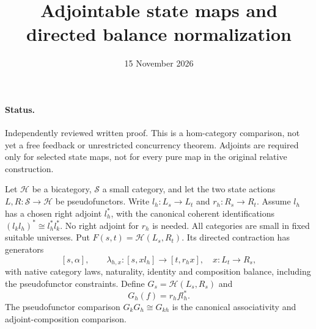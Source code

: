 \documentclass[11pt]{article}
\title{Adjointable state maps and directed balance normalization}
\date{15 November 2026}
\begin{document}
\maketitle
\paragraph{Status.} Independently reviewed written proof. This is a hom-category comparison, not yet a free feedback or unrestricted concurrency theorem. Adjoints are required only for selected state maps, not for every pure map in the original relative construction.

Let $\mathcal H$ be a bicategory, $\mathcal S$ a small category, and let the two state actions $L,R:\mathcal S\to\mathcal H$ be pseudofunctors. Write $l_h:L_s\to L_t$ and $r_h:R_s\to R_t$. Assume $l_h$ has a chosen right adjoint $l_h^*$, with the canonical coherent identifications $(l_kl_h)^*\cong l_h^*l_k^*$. No right adjoint for $r_h$ is needed. All categories are small in fixed suitable universes.
Put $F(s,t)=\mathcal H(L_s,R_t)$. Its directed contraction has generators
\[
 [s,\alpha],\qquad \lambda_{h,x}:[s,x l_h]\to[t,r_hx],\quad x:L_t\to R_s,
\]
with native category laws, naturality, identity and composition balance, including the pseudofunctor constraints.
Define $G_s=\mathcal H(L_s,R_s)$ and
\[
 G_h(f)=r_h f l_h^*.
\]
The pseudofunctor comparison $G_kG_h\cong G_{kh}$ is the canonical associativity and adjoint-composition comparison.
\end{document}
